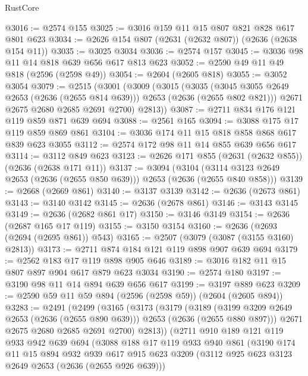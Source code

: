 \begin{lexlean}{RustCore}
\begin{coremodule}
@3016 := @2574 @155
@3025 := @3016 @159 @11 @15 @807 @821 @828 @617 @801 @623
@3034 := @2626 @154 @807 (@2631 (@2632 @807)) (@2636 (@2638 @154 @11))
@3035 := @3025 @3034
@3036 := @2574 @157
@3045 := @3036 @98 @11 @14 @818 @639 @656 @617 @813 @623
@3052 := @2590 @49 @11 @49 @818 (@2596 (@2598 @49))
@3054 := @2604 (@2605 @818)
@3055 := @3052 @3054
@3079 := @2515
    (@3001
      (@3009
        (@3015
          (@3035
            (@3045 @3055 @2649 @2653 (@2636 (@2655 @814 @639)))
            @2653
            (@2636 (@2655 @802 @821)))
          @2671
          @2675
          @2680
          @2685
          @2691
          @2700)
        @2813))
@3087 := @2711 @834 @176 @121 @119 @859 @871 @639 @694
@3088 := @2561 @165
@3094 := @3088 @175 @17 @119 @859 @869 @861
@3104 := @3036 @174 @11 @15 @818 @858 @868 @617 @839 @623 @3055
@3112 := @2574 @172 @98 @11 @14 @855 @639 @656 @617
@3114 := @3112 @849 @623
@3123 := @2626 @171 @855 (@2631 (@2632 @855)) (@2636 (@2638 @171 @11))
@3137 := @3094
    (@3104 (@3114 @3123 @2649 @2653 (@2636 (@2655 @850 @639))) @2653 (@2636 (@2655 @840 @858)))
@3139 := @2668 (@2669 @861)
@3140 := @3137 @3139
@3142 := @2636 (@2673 @861)
@3143 := @3140 @3142
@3145 := @2636 (@2678 @861)
@3146 := @3143 @3145
@3149 := @2636 (@2682 @861 @17)
@3150 := @3146 @3149
@3154 := @2636 (@2687 @165 @17 @119)
@3155 := @3150 @3154
@3160 := @2636 (@2693 (@2694 (@2695 @861)) @543)
@3165 := @2507 (@3079 (@3087 (@3155 @3160) @2813))
@3173 := @2711 @874 @184 @121 @119 @898 @907 @639 @694
@3179 := @2562 @183 @17 @119 @898 @905 @646
@3189 := @3016 @182 @11 @15 @807 @897 @904 @617 @879 @623 @3034
@3190 := @2574 @180
@3197 := @3190 @98 @11 @14 @894 @639 @656 @617
@3199 := @3197 @889 @623
@3209 := @2590 @59 @11 @59 @894 (@2596 (@2598 @59)) (@2604 (@2605 @894))
@3283 := @2491
    (@2499
      (@3165
        (@3173
          (@3179
            (@3189
              (@3199 @3209 @2649 @2653 (@2636 (@2655 @890 @639)))
              @2653
              (@2636 (@2655 @880 @897)))
            @2671
            @2675
            @2680
            @2685
            @2691
            @2700)
          @2813))
      (@2711
        @910
        @189
        @121
        @119
        @933
        @942
        @639
        @694
        (@3088
          @188
          @17
          @119
          @933
          @940
          @861
          (@3190
            @174
            @11
            @15
            @894
            @932
            @939
            @617
            @915
            @623
            @3209
            (@3112 @925 @623 @3123 @2649 @2653 (@2636 (@2655 @926 @639)))

\end{coremodule}
\end{lexlean}
